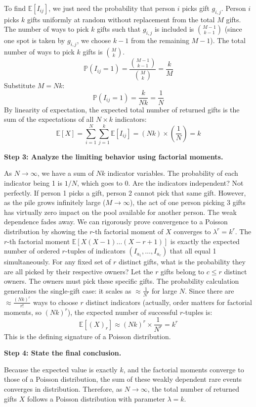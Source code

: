 \begin{solution}
To find $\mathbb{E}[I_{ij}]$, we just need the probability that person $i$ picks gift $g_{i,j}$.
Person $i$ picks $k$ gifts uniformly at random without replacement from the total $M$ gifts.
The number of ways to pick $k$ gifts such that $g_{i,j}$ is included is $\binom{M-1}{k-1}$ (since one spot is taken by $g_{i,j}$, we choose $k-1$ from the remaining $M-1$).
The total number of ways to pick $k$ gifts is $\binom{M}{k}$.
\[ \mathbb{P}(I_{ij} = 1) = \frac{\binom{M-1}{k-1}}{\binom{M}{k}} = \frac{k}{M} \]
Substitute $M = Nk$:
\[ \mathbb{P}(I_{ij} = 1) = \frac{k}{Nk} = \frac{1}{N} \]
By linearity of expectation, the expected total number of returned gifts is the sum of the expectations of all $N \times k$ indicators:
\[ \mathbb{E}[X] = \sum_{i=1}^N \sum_{j=1}^k \mathbb{E}[I_{ij}] = (Nk) \times \left(\frac{1}{N}\right) = k \]

\textbf{Step 3: Analyze the limiting behavior using factorial moments.}

As $N \to \infty$, we have a sum of $Nk$ indicator variables. The probability of each indicator being 1 is $1/N$, which goes to 0.
Are the indicators independent? Not perfectly. If person 1 picks a gift, person 2 cannot pick that same gift. However, as the pile grows infinitely large ($M \to \infty$), the act of one person picking 3 gifts has virtually zero impact on the pool available for another person. The weak dependence fades away.
We can rigorously prove convergence to a Poisson distribution by showing the $r$-th factorial moment of $X$ converges to $\lambda^r = k^r$.
The $r$-th factorial moment $\mathbb{E}[X(X-1)\dots(X-r+1)]$ is exactly the expected number of ordered $r$-tuples of indicators $(I_{a_1}, \dots, I_{a_r})$ that all equal 1 simultaneously.
For any fixed set of $r$ distinct gifts, what is the probability they are all picked by their respective owners?
Let the $r$ gifts belong to $c \leq r$ distinct owners. The owners must pick these specific gifts. The probability calculation generalizes the single-gift case: it scales as $\approx \frac{1}{N^r}$ for large $N$.
Since there are $\approx \frac{(Nk)^r}{r!}$ ways to choose $r$ distinct indicators (actually, order matters for factorial moments, so $(Nk)^r$), the expected number of successful $r$-tuples is:
\[ \mathbb{E}[(X)_r] \approx (Nk)^r \times \frac{1}{N^r} = k^r \]
This is the defining signature of a Poisson distribution.

\textbf{Step 4: State the final conclusion.}

Because the expected value is exactly $k$, and the factorial moments converge to those of a Poisson distribution, the sum of these weakly dependent rare events converges in distribution.
Therefore, as $N \to \infty$, the total number of returned gifts $X$ follows a Poisson distribution with parameter $\lambda = k$.
\end{solution}

